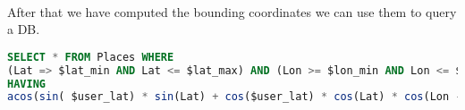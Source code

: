 \\
\noindent After that we have computed the bounding coordinates we can use them to query a DB.\\
\begin{lstlisting}[language=SQL]
SELECT * FROM Places WHERE
(Lat => $lat_min AND Lat <= $lat_max) AND (Lon >= $lon_min AND Lon <= $lon_max )
HAVING
acos(sin( $user_lat) * sin(Lat) + cos($user_lat) * cos(Lat) * cos(Lon - ($user_lon))) <= r;
\end{lstlisting}